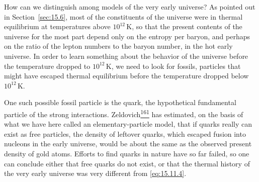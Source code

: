 How can we distinguish among models of the very early universe? As pointed
out in Section~\ref{sec:15.6}, most of the constituents of the universe were
in thermal equilibrium at temperatures above \(10^{12}\,\mathrm K\), so that
the present contents of the universe for the most part depend only on the
entropy per baryon, and perhaps on the ratio of the lepton numbers to the
baryon number, in the hot early universe. In order to learn something about
the behavior of the universe before the temperature dropped to
\(10^{12}\,\mathrm K\), we need to look for fossils, particles that might
have escaped thermal equilibrium before the temperature dropped below
\(10^{12}\,\mathrm K\).

One such possible fossil particle is the quark, the hypothetical fundamental
particle of the strong interactions.
Zeldovich\hyperref[ch15-ref-161]{\textsuperscript{161}} has estimated, on the
basis of what we have here called an elementary-particle model, that if quarks
really can exist as free particles, the density of leftover quarks, which
escaped fusion into nucleons in the early universe, would be about the same as
the observed present density of gold atoms. Efforts to find quarks in nature
have so far failed, so one can conclude either that free quarks do not exist, or
that the thermal history of the very early universe was very different from
\eqref{eq:15.11.4}.

